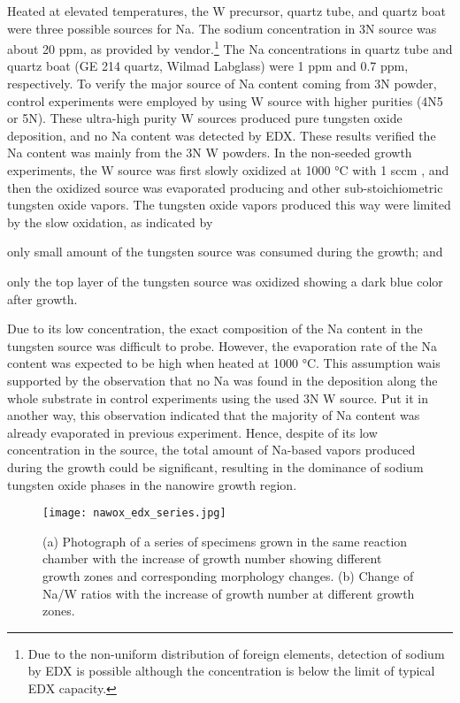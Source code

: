 Heated at elevated temperatures, the W precursor, quartz tube, and quartz boat were three possible sources for Na. The sodium concentration in 3N source was about 20 ppm, as provided by vendor.\footnote{Due to the non-uniform distribution of foreign elements, detection of sodium by EDX is possible although the concentration is below the limit of typical EDX capacity.} The Na concentrations in quartz tube and quartz boat (GE 214 quartz, Wilmad Labglass) were 1 ppm and 0.7 ppm, respectively. To verify the major source of Na content coming from 3N powder, control experiments were employed by using W source with higher purities (4N5 or 5N). These ultra-high purity W sources produced pure tungsten oxide deposition, and no Na content was detected by EDX. These results verified the Na content was mainly from the 3N W powders. In the non-seeded growth experiments, the W source was first slowly oxidized at 1000 \si{\degreeCelsius} with 1 sccm , and then the oxidized source was evaporated producing  and other sub-stoichiometric tungsten oxide vapors. The tungsten oxide vapors produced this way were limited by the slow oxidation, as indicated by
\begin{enumerate*}[label=\itshape\alph*\upshape)]
\item only small amount of the tungsten source was consumed during the growth; and
\item only the top layer of the tungsten source was oxidized showing a dark blue color after growth.
\end{enumerate*} Due to its low concentration, the exact composition of the Na content in the tungsten source was difficult to probe. However, the evaporation rate of the Na content was expected to be high when heated at 1000 \si{\degreeCelsius}. This assumption wais supported by the observation that no Na was found in the deposition along the whole substrate in control experiments using the used 3N W source. Put it in another way, this observation indicated that the majority of Na content was already evaporated in previous experiment. Hence, despite of its low concentration in the source, the total amount of Na-based vapors produced during the growth could be significant, resulting in the dominance of sodium tungsten oxide phases in the nanowire growth region.

\begin{figure}[htb]
\centering
\texttt{[image: nawox\_edx\_series.jpg]}
\caption[Photograph of a series of specimens grown]{(a) Photograph of a series of specimens grown in the same reaction chamber with the increase of growth number showing different growth zones and corresponding morphology changes. (b) Change of Na/W ratios with the increase of growth number at different growth zones.}
\label{fig:nawoxser}
\end{figure}

